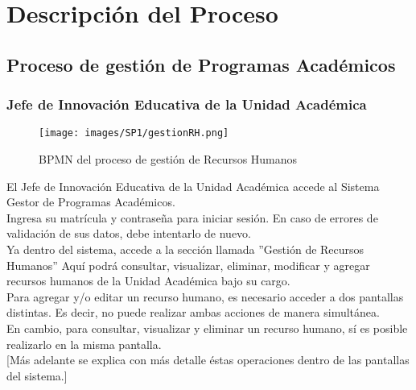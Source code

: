 \chapter{Descripción del Proceso}
    \section{Proceso de gestión de Programas Académicos}
        \subsection{Jefe de Innovación Educativa de la Unidad Académica}
        
        \begin{figure}[!hbtp]
        	\centering
        	\hypertarget{bpmn}{\texttt{[image: images/SP1/gestionRH.png]}}
        	\caption{BPMN del proceso de gestión de Recursos Humanos}
        	\label{editarrh}
        \end{figure}
        
        El Jefe de Innovación Educativa de la Unidad Académica accede al Sistema Gestor de Programas Académicos.\\
        
        Ingresa su matrícula y contraseña para iniciar sesión. En caso de errores de validación de sus datos, debe intentarlo de nuevo.\\
        
        Ya dentro del sistema, accede a la sección llamada ''Gestión de Recursos Humanos'' Aquí podrá consultar, visualizar, eliminar, modificar y agregar recursos humanos de la Unidad Académica bajo su cargo. \\
        
        Para agregar y/o editar un recurso humano, es necesario acceder a dos pantallas distintas. Es decir, no puede realizar ambas acciones de manera simultánea.\\
        
        En cambio, para consultar, visualizar y eliminar un recurso humano, sí es posible realizarlo en la misma pantalla.\\
        
        [Más adelante se explica con más detalle éstas operaciones dentro de las pantallas del sistema.]\\
        
        

